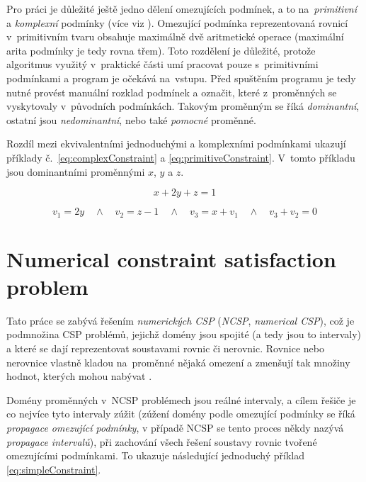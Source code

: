 Pro práci je důležité ještě jedno dělení omezujících podmínek, a to na~\emph{primitivní} a \emph{komplexní} podmínky (více viz \cite{kue12}). Omezující podmínka reprezentovaná rovnicí v~primitivním tvaru obsahuje maximálně dvě aritmetické operace (maximální arita podmínky je tedy rovna třem). Toto rozdělení je důležité, protože algoritmus využitý v~praktické části umí pracovat pouze s~primitivními podmínkami a program je očekává na~vstupu. Před spuštěním programu je tedy nutné provést manuální rozklad podmínek a označit, které z~proměnných se vyskytovaly v~původních podmínkách. Takovým proměnným se říká \emph{dominantní}, ostatní jsou \emph{nedominantní}, nebo také \emph{pomocné} proměnné.

Rozdíl mezi ekvivalentními jednoduchými a komplexními podmínkami ukazují příklady č.~\ref{eq:complexConstraint} a \ref{eq:primitiveConstraint}. V~tomto příkladu jsou dominantními proměnnými $x$, $y$ a $z$.

\begin{equation} \label{eq:complexConstraint}
x + 2y + z = 1
\end{equation}

\begin{equation} \label{eq:primitiveConstraint}
v_1 = 2y \quad \wedge \quad v_2 = z - 1 \quad \wedge \quad v_3 = x + v_1 \quad \wedge \quad v_3 + v_2 = 0
\end{equation}





\section{Numerical constraint satisfaction problem}
\label{ch:ncsp}

Tato práce se zabývá řešením \emph{numerických CSP} (\emph{NCSP}, \emph{numerical CSP}), což je podmnožina CSP problémů, jejichž domény jsou spojité (a tedy jsou to intervaly) a které se dají reprezentovat soustavami rovnic či nerovnic. Rovnice nebo nerovnice vlastně kladou na~proměnné nějaká omezení a zmenšují tak množiny hodnot, kterých mohou nabývat \cite{rueherDependency}.

Domény proměnných v~NCSP problémech jsou reálné intervaly, a cílem řešiče je co nejvíce tyto intervaly zúžit (zúžení domény podle omezující podmínky se říká \emph{propagace omezující podmínky}, v případě NCSP se tento proces někdy nazývá \emph{propagace intervalů}), při zachování všech řešení soustavy rovnic tvořené omezujícími podmínkami. To ukazuje následující jednoduchý příklad \ref{eq:simpleConstraint}.

